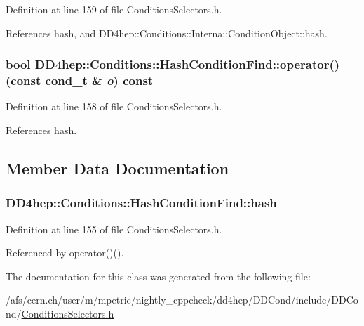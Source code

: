 Definition at line 159 of file ConditionsSelectors.h.

References hash, and DD4hep::Conditions::Interna::ConditionObject::hash.\hypertarget{class_d_d4hep_1_1_conditions_1_1_hash_condition_find_ad9f416ab03f1797a60fbbf1785f4de1e}{
\subsubsection[{operator()}]{\setlength{\rightskip}{0pt plus 5cm}bool DD4hep::Conditions::HashConditionFind::operator() (const {\bf cond\_\-t} \& {\em o}) const}}
\label{class_d_d4hep_1_1_conditions_1_1_hash_condition_find_ad9f416ab03f1797a60fbbf1785f4de1e}


Definition at line 158 of file ConditionsSelectors.h.

References hash.

\subsection{Member Data Documentation}
\hypertarget{class_d_d4hep_1_1_conditions_1_1_hash_condition_find_a9be86da61865f479161109ec62efa26a}{
\subsubsection[{hash}]{ {\bf DD4hep::Conditions::HashConditionFind::hash}}}
\label{class_d_d4hep_1_1_conditions_1_1_hash_condition_find_a9be86da61865f479161109ec62efa26a}


Definition at line 155 of file ConditionsSelectors.h.

Referenced by operator()().

The documentation for this class was generated from the following file:\begin{DoxyCompactItemize}
\item 
/afs/cern.ch/user/m/mpetric/nightly\_\-cppcheck/dd4hep/DDCond/include/DDCond/\hyperlink{_conditions_selectors_8h}{ConditionsSelectors.h}\end{DoxyCompactItemize}
